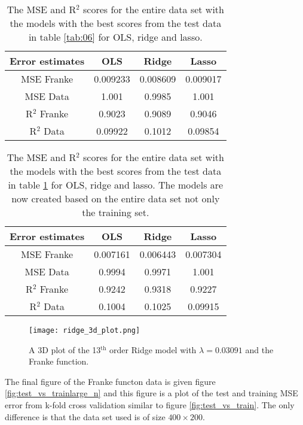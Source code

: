\documentclass[uio,jmp,amsmath,amssymb,reprint,nofootinbib]{revtex4-1}
\numberwithin{equation}{section}
\begin{document}
\begin{table}
\begin{tabular}{|c|c|c|c|}\hline
Error estimates & OLS & Ridge & Lasso \\ \hline
MSE Franke & 0.009233 & 0.008609 & 0.009017 \\ \hline
MSE Data & 1.001 & 0.9985 & 1.001 \\ \hline
R\(^2\) Franke & 0.9023 & 0.9089 & 0.9046 \\ \hline
R\(^2\) Data & 0.09922 & 0.1012 & 0.09854 \\ \hline
\end{tabular}
\caption{The MSE and R\(^2\) scores for the entire data set with the models with the best scores from the test data in table \ref{tab:06} for OLS, ridge and lasso.}
\label{tab:07}
\end{table}

\begin{table}
\begin{tabular}{|c|c|c|c|}\hline
Error estimates & OLS & Ridge & Lasso \\ \hline
MSE Franke & 0.007161 & 0.006443 & 0.007304 \\ \hline
MSE Data & 0.9994 & 0.9971 & 1.001 \\ \hline
R\(^2\) Franke & 0.9242 & 0.9318 & 0.9227 \\ \hline
R\(^2\) Data & 0.1004 & 0.1025 & 0.09915 \\ \hline
\end{tabular}
\caption{The MSE and R\(^2\) scores for the entire data set with the models with the best scores from the test data in table \ref{tab:07} for OLS, ridge and lasso. The models are now created based on the entire data set not only the training set.}
\label{tab:07_2}
\end{table}


\begin{figure}[H]
    \centering
    \texttt{[image: ridge\_3d\_plot.png]}
    \caption{A 3D plot of the 13\(^\text{th}\) order Ridge model with \(\lambda = 0.03091\) and the Franke function.}
    \label{fig:ridge_3d}
\end{figure}

The final figure of the Franke functon data is given figure \ref{fig:test_vs_trainlarge_n} and this figure is a plot of the test and training MSE error from k-fold cross validation similar to figure \ref{fig:test_vs_train}. The only difference is that the data set used is of size \(400\times 200\).
\end{document}

